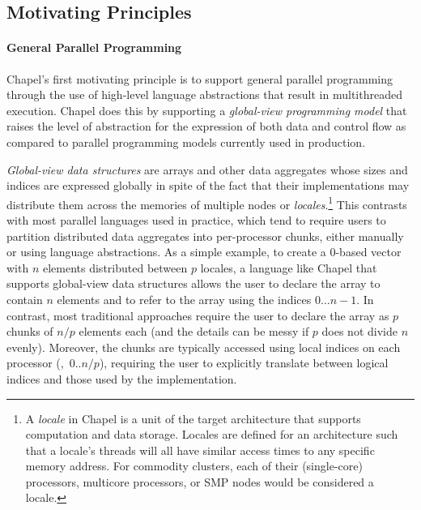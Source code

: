 \label{Language_Overview}

\subsection{Motivating Principles}

\paragraph{General Parallel Programming}

Chapel's first motivating principle is to support general parallel
programming through the use of high-level language abstractions that
result in multithreaded execution.  Chapel does this by supporting a
\emph{global-view programming model} that raises the level of
abstraction for the expression of both data and control flow as
compared to parallel programming models currently used in production.

\emph{Global-view data structures} are arrays and other data
aggregates whose sizes and indices are expressed globally in spite of
the fact that their implementations may distribute them across the
memories of multiple nodes or \emph{locales}.\footnote{A \emph{locale}
  in Chapel is a unit of the target architecture that supports
  computation and data storage.  Locales are defined for an
  architecture such that a locale's threads will all have similar
  access times to any specific memory address.  For commodity
  clusters, each of their (single-core) processors, multicore
  processors, or SMP nodes would be considered a locale.}  This
contrasts with most parallel languages used in practice, which tend to
require users to partition distributed data aggregates into
per-processor chunks, either manually or using language abstractions.
As a simple example, to create a 0-based vector with $n$ elements
distributed between $p$ locales, a language like Chapel that supports
global-view data structures allows the user to declare the array to
contain $n$ elements and to refer to the array using the indices $0
\ldots n-1$.  In contrast, most traditional approaches require the
user to declare the array as $p$ chunks of $n/p$ elements each (and
the details can be messy if $p$ does not divide $n$ evenly).
Moreover, the chunks are typically accessed using local indices on
each processor (\eg,~$0..n/p$), requiring the user to explicitly
translate between logical indices and those used by the
implementation.


